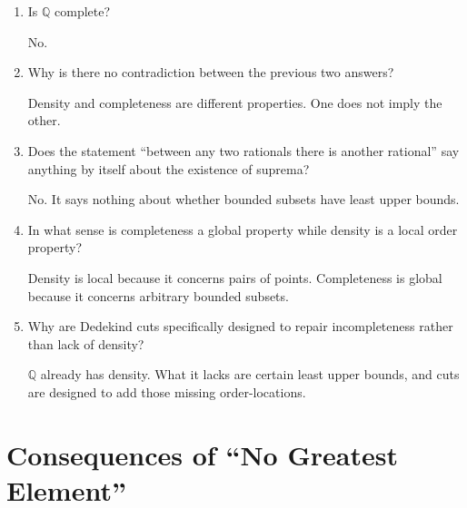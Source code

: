 \documentclass{self-check}
\begin{document}
\begin{enumerate}[label=\arabic*., itemsep=10pt]
\begin{answer}
Yes.
\end{answer}

\item Is $\mathbb{Q}$ complete?

\begin{answer}
No.
\end{answer}

\item Why is there no contradiction between the previous two answers?

\begin{answer}
Density and completeness are different properties. One does not imply the other.
\end{answer}

\item Does the statement
``between any two rationals there is another rational''
say anything by itself about the existence of suprema?

\begin{answer}
No. It says nothing about whether bounded subsets have least upper bounds.
\end{answer}

\item In what sense is completeness a global property while density is a local order property?

\begin{answer}
Density is local because it concerns pairs of points. Completeness is global because it concerns arbitrary bounded subsets.
\end{answer}

\item Why are Dedekind cuts specifically designed to repair incompleteness rather than lack of density?

\begin{answer}
$\mathbb{Q}$ already has density. What it lacks are certain least upper bounds, and cuts are designed to add those missing order-locations.
\end{answer}

\end{enumerate}

\section{Consequences of ``No Greatest Element''}
\end{document}
